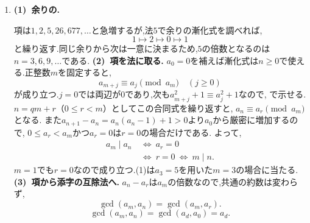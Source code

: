 \begin{enumerate}[label=\textbf{問\arabic*.},leftmargin=3.8em,format=\bookitemlink{practice-entrance}{solution}{problem}]
    先頭が$1$の成功配置は\textcircled{1}の対応から$c_{n-2}$通りなので,
    \textcircled{3}は$c_{n-1}-c_{n-2}$通りとなる.
    \par\textbf{\textcircled{4}の数え方.}
    最初の二枚を交換すれば\textcircled{3}に一対一で対応し,最初の比較後は同じ配列になる.
    よってこちらも$c_{n-1}-c_{n-2}$通りであり,
    \[
      c_n=2c_{n-1}+2(c_{n-1}-c_{n-2})
      =4c_{n-1}-2c_{n-2}.
    \]
    引いた$c_{n-2}$は,\textcircled{3}の縮約先から除く「先頭が$1$の配置」の数である.
    \smallskip\textbf{(3)~個数から隣接3項間型へ.}
    $x^2-4x+2=0$の解は$2\pm\sqrt2$である.
    \[
      c_n=P(2+\sqrt2)^{n-1}+Q(2-\sqrt2)^{n-1}
    \]
    に$c_1=1,c_2=2$を入れると$P=Q=\frac{1}{2}$であり,解答の式を得る.
    $c_4=20,c_5=68$となる.二つのべきで$\sqrt2$の奇数次の項が相殺され,個数は整数になる.
    この問の中心は,解く前の「何を取り除き,どう戻すか」という設計にある.
  \item \textbf{(1)~余りの.}\par\nobreak
    項は$1,2,5,26,677,\ldots$と急増するが,法$5$で余りの漸化式を調べれば,
    \[
      1\longmapsto2\longmapsto0\longmapsto1
    \]
    と繰り返す.同じ余りから次は一意に決まるため,$5$の倍数となるのは$n=3,6,9,\ldots$である.
    \smallskip\textbf{(2)~項を法に取る.}
    $a_0=0$を補えば漸化式は$n\ge0$で使える.正整数$m$を固定すると,
    \[
      a_{m+j}\equiv a_j\pmod{a_m}\quad(j\ge0)
    \]
    が成り立つ.$j=0$では両辺が0であり,次も$a_{m+j}^2+1\equiv a_j^2+1$なので,
    で示せる.
    $n=qm+r$（$0\le r<m$）としてこの合同式を繰り返すと,
    $a_n\equiv a_r\pmod{a_m}$となる.
    また$a_{n+1}-a_n=a_n(a_n-1)+1>0$より$a_0$から厳密に増加するので,
    $0\le a_r<a_m$かつ$a_r=0$は$r=0$の場合だけである.
    よって,
    \[
      \begin{aligned}
        a_m\mid a_n&\ \Longleftrightarrow\ a_r=0\\
        &\ \Longleftrightarrow\ r=0\ \Longleftrightarrow\ m\mid n.
      \end{aligned}
    \]
    $m=1$でも$r=0$なので成り立つ.(1)は$a_3=5$を用いた$m=3$の場合に当たる.
    \smallskip\textbf{(3)~項から添字の互除法へ.}
    $a_n-a_r$は$a_m$の倍数なので,共通の約数は変わらず,
    \[
      \gcd(a_m,a_n)=\gcd(a_m,a_r).
    \]
    \[
      \gcd(a_m,a_n)=\gcd(a_d,a_0)=a_d.
\]
\end{enumerate}
